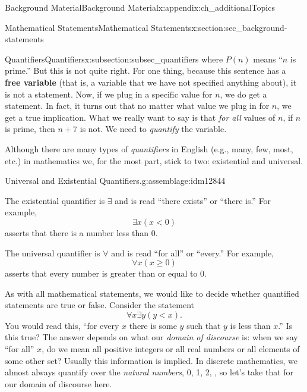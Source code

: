 \documentclass[oneside,10pt,]{book}
\newcommand{\terminology}[1]{\textbf{#1}}
\numberwithin{equation}{chapter}
\newcommand{\lt}{<}
\begin{document}
\begin{appendixptx}{Background Material}{}{Background Material}{}{}{x:appendix:ch_additionalTopics}
\begin{sectionptx}{Mathematical Statements}{}{Mathematical Statements}{}{}{x:section:sec_background-statements}
\begin{subsectionptx}{Quantifiers}{}{Quantifiers}{}{}{x:subsection:subsec_quantifiers}
where \(P(n)\) means ``\(n\) is prime.'' But this is not quite right. For one thing, because this sentence has a \terminology{free variable} (that is, a variable that we have not specified anything about), it is not a statement. Now, if we plug in a specific value for \(n\), we do get a statement. In fact, it turns out that no matter what value we plug in for \(n\), we get a true implication. What we really want to say is that \emph{for all} values of \(n\), if \(n\) is prime, then \(n+7\) is not. We need to \emph{quantify} the variable.%
\par
Although there are many types of \emph{quantifiers} in English (e.g., many, few, most, etc.) in mathematics we, for the most part, stick to two: existential and universal.%
\begin{assemblage}{Universal and Existential Quantifiers.}{g:assemblage:idm12844}%
%
\par
The existential quantifier is \(\exists\) and is read ``there exists'' or ``there is.'' For example, \label{g:notation:idm12858}%
\begin{equation*}
\exists x (x \lt 0)
\end{equation*}
asserts that there is a number less than 0.%
\par
The universal quantifier is \(\forall\) and is read ``for all'' or ``every.'' For example,  \label{g:notation:idm12871}%
\begin{equation*}
\forall x (x \ge 0)
\end{equation*}
asserts that every number is greater than or equal to 0.%
\end{assemblage}
As with all mathematical statements, we would like to decide whether quantified statements are true or false. Consider the statement%
\begin{equation*}
\forall x \exists y (y \lt x).
\end{equation*}
You would read this, ``for every \(x\) there is some \(y\) such that \(y\) is less than \(x\).'' Is this true? The answer depends on what our \emph{domain of discourse} is: when we say ``for all'' \(x\), do we mean all positive integers or all real numbers or all elements of some other set? Usually this information is implied. In discrete mathematics, we almost always quantify over the \emph{natural numbers}, 0, 1, 2, \textellipsis{}, so let's take that for our domain of discourse here.%
\par

\end{subsectionptx}
\end{sectionptx}
\end{appendixptx}
\end{document}
